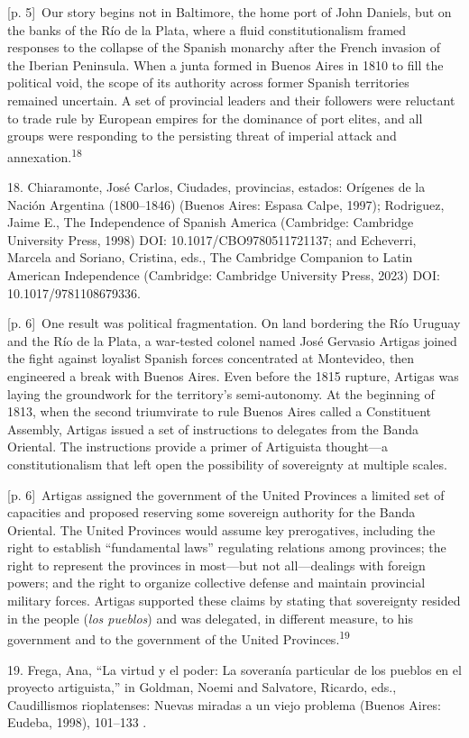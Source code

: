 \documentclass[10pt,a4paper]{article}
\begin{document}
{\scriptsize\color{gray} [p. 5]}\ Our story begins not in Baltimore, the home port of John Daniels, but on the banks of the Río de la Plata, where a fluid constitutionalism framed responses to the collapse of the Spanish monarchy after the French invasion of the Iberian Peninsula. When a junta formed in Buenos Aires in 1810 to fill the political void, the scope of its authority across former Spanish territories remained uncertain. A set of provincial leaders and their followers were reluctant to trade rule by European empires for the dominance of port elites, and all groups were responding to the persisting threat of imperial attack and annexation.\nobreak\textsuperscript{18}\par{\small 18. Chiaramonte, José Carlos, Ciudades, provincias, estados: Orígenes de la Nación Argentina (1800–1846) (Buenos Aires: Espasa Calpe, 1997); Rodriguez, Jaime E., The Independence of Spanish America (Cambridge: Cambridge University Press, 1998) DOI: 10.1017/CBO9780511721137; and Echeverri, Marcela and Soriano, Cristina, eds., The Cambridge Companion to Latin American Independence (Cambridge: Cambridge University Press, 2023) DOI: 10.1017/9781108679336.\par}
{\scriptsize\color{gray} [p. 6]}\ One result was political fragmentation. On land bordering the Río Uruguay and the Río de la Plata, a war-tested colonel named José Gervasio Artigas joined the fight against loyalist Spanish forces concentrated at Montevideo, then engineered a break with Buenos Aires. Even before the 1815 rupture, Artigas was laying the groundwork for the territory’s semi-autonomy. At the beginning of 1813, when the second triumvirate to rule Buenos Aires called a Constituent Assembly, Artigas issued a set of instructions to delegates from the Banda Oriental. The instructions provide a primer of Artiguista thought—a constitutionalism that left open the possibility of sovereignty at multiple scales.\par
{\scriptsize\color{gray} [p. 6]}\ Artigas assigned the government of the United Provinces a limited set of capacities and proposed reserving some sovereign authority for the Banda Oriental. The United Provinces would assume key prerogatives, including the right to establish “fundamental laws” regulating relations among provinces; the right to represent the provinces in most—but not all—dealings with foreign powers; and the right to organize collective defense and maintain provincial military forces. Artigas supported these claims by stating that sovereignty resided in the people (\textit{los pueblos}) and was delegated, in different measure, to his government and to the government of the United Provinces.\nobreak\textsuperscript{19}\par{\small 19. Frega, Ana, “La virtud y el poder: La soveranía particular de los pueblos en el proyecto artiguista,” in Goldman, Noemi and Salvatore, Ricardo, eds., Caudillismos rioplatenses: Nuevas miradas a un viejo problema (Buenos Aires: Eudeba, 1998), 101–133 .\par}
\end{document}
